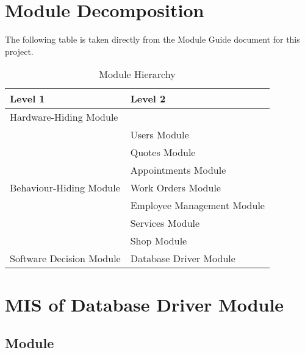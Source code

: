 \documentclass[12pt, titlepage]{article}
\begin{document}
\section{Module Decomposition}

The following table is taken directly from the Module Guide document for this project.

\begin{table}[H]
	\centering
	\begin{tabular}{p{} p{}}
		\toprule
		\textbf{Level 1}                                      & \textbf{Level 2}           \\
		\midrule

		Hardware-Hiding Module                                & ~                          \\

		\midrule

		\multirow{7}{0.3\textwidth}{Behaviour-Hiding Module}  & Users Module               \\
		                                                      & Quotes Module              \\
		                                                      & Appointments Module        \\
		                                                      & Work Orders Module         \\
		                                                      & Employee Management Module \\
		                                                      & Services Module            \\
		                                                      & Shop Module                \\
		\midrule

		\multirow{1}{0.3\textwidth}{Software Decision Module} & Database Driver Module     \\

		\bottomrule
	\end{tabular}
	\caption{Module Hierarchy}
	\label{TblMH}
\end{table}

\newpage

\section{MIS of Database Driver Module} \label{mDBDriver}
\subsection{Module}
\end{document}
